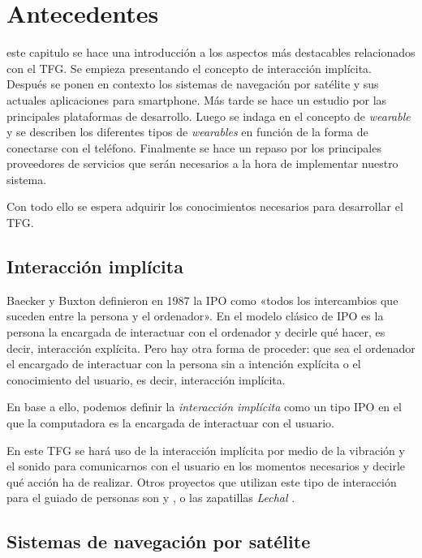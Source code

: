 \chapter{Antecedentes}
\label{chap:antecedentes}

 este capitulo se hace una introducción a los aspectos más destacables relacionados con
el \acs{TFG}. Se empieza presentando el concepto de interacción implícita. Después se ponen en
contexto los sistemas de navegación por satélite y sus actuales aplicaciones para smartphone. Más
tarde se hace un estudio por las principales plataformas de desarrollo. Luego se indaga en el
concepto de \emph{wearable} y se describen los diferentes tipos de \emph{wearables} en función de la
forma de conectarse con el teléfono. Finalmente se hace un repaso por los principales proveedores de
servicios que serán necesarios a la hora de implementar nuestro sistema. 

Con todo ello se espera adquirir los conocimientos necesarios para desarrollar el \acs{TFG}.

\section{Interacción implícita}

Baecker y Buxton definieron en 1987 la \acf{IPO} como «todos los intercambios que suceden entre la
  persona y el ordenador». En el modelo clásico de \acs{IPO} es la persona la encargada de
interactuar con el ordenador y decirle qué hacer, es decir, interacción explícita. Pero hay otra
forma de proceder: que sea el ordenador el encargado de interactuar con la persona sin a intención
explícita o el conocimiento del usuario, es decir, interacción implícita.

En base a ello, podemos definir la \emph{interacción implícita} como un tipo \acs{IPO} en el que la
computadora es la encargada de interactuar con el usuario.

En este \acs{TFG} se hará uso de la interacción implícita por medio de la vibración y el sonido para
comunicarnos con el usuario en los momentos necesarios y decirle qué acción ha de realizar. Otros
proyectos que utilizan este tipo de interacción para el guiado de personas son \cite{Boemo12} y
\cite{Merino13}, o las zapatillas \emph{Lechal} \cite{Lechal}.

\section{Sistemas de navegación por satélite}

